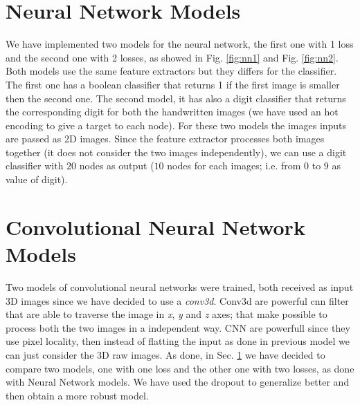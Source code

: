 \documentclass[journal, a4paper]{IEEEtran}
\begin{document}
\section{Neural Network Models}
\label{sec:nnmodel}
We have implemented two models for the neural network, the first one with 1 loss and the second one with 2 losses, as showed in Fig. \ref{fig:nn1} and Fig. \ref{fig:nn2}. Both models use the same feature extractors but they differs for the classifier. The first one has a boolean classifier that returns 1 if the first image is smaller then the second one. The second model, it has also a digit classifier that returns the corresponding digit for both the handwritten images (we have used an hot encoding to give a target to each node).
For these two models the images inputs are passed as 2D images.  Since the feature extractor processes both images together (it does not consider the two images independently), we can use a digit classifier with $20$ nodes as output ($10$ nodes for each images; i.e. from $0$ to $9$ as value of digit). 



\section{Convolutional Neural Network Models}
\label{sec:cnnmodel}
Two models of convolutional neural networks were trained, both received as input 3D images since we have decided to use a \textit{conv3d}. Conv3d are powerful cnn filter that are able to traverse the image in \textit{x}, \textit{y} and \textit{z} axes; that make possible to process both the two images in a independent way. CNN are powerfull since they use pixel locality, then instead of flatting the input as done in previous model we can just consider the 3D raw images. As done, in Sec. \ref{sec:nnmodel} we have decided to compare two models, one with one loss and the other one with two losses, as done with Neural Network models. 
We have used the dropout to generalize better and then obtain a more robust model.
\end{document}
